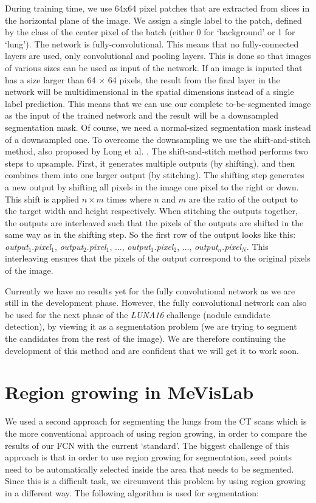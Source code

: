 \documentclass[a4paper,10pt]{article}
\numberwithin{equation}{section} %
\numberwithin{figure}{section} %
\numberwithin{table}{section} %
\begin{document}
During training time, we use 64x64 pixel patches that are extracted from slices in the horizontal plane of the image.
We assign a single label to the patch, defined by the class of the center pixel of the batch (either 0 for `background' or 1 for `lung').
The network is fully-convolutional. This means that no fully-connected layers are used, only convolutional and pooling layers.
This is done so that images of various sizes can be used as input of the network.
If an image is inputed that has a size larger than 64 $\times$ 64 pixels, the result from the final layer in the network will be multidimensional in the spatial dimensions instead of a single label prediction.
This means that we can use our complete to-be-segmented image as the input of the trained network and the result will be a downsampled segmentation mask.
Of course, we need a normal-sized segmentation mask instead of a downsampled one.
To overcome the downsampling we use the shift-and-stitch method, also proposed by Long et al. \cite{long2015fully}. The shift-and-stitch method performs two steps to upsample. First, it generates multiple outputs (by shifting), and then combines them into one larger output (by stitching). The shifting step generates a new output by shifting all pixels in the image one pixel to the right or down. This shift is applied $n \times m$ times where $n$ and $m$ are the ratio of the output to the target width and height respectively.
When stitching the outputs together, the outputs are interleaved such that the pixels of the outputs are shifted in the same way as in the shifting step. So the first row of the output looks like this: \textit{output}$_1$.\textit{pixel}$_1$, \textit{output}$_2$.\textit{pixel}$_1$, $\hdots$, \textit{output}$_1$.\textit{pixel}$_2$, $\hdots$, \textit{output}$_n$.\textit{pixel}$_N$. This interleaving ensures that the pixels of the output correspond to the original pixels of the image.

Currently we have no results yet for the fully convolutional network as we are still in the development phase. However, the fully convolutional network can also be used for the next phase of the \textit{LUNA16} challenge (nodule candidate detection), by viewing it as a segmentation problem (we are trying to segment the candidates from the rest of the image). We are therefore continuing the development of this method and are confident that we will get it to work soon.

\section{Region growing in MeVisLab}
We used a second approach for segmenting the lungs from the CT scans which is the more conventional approach of using region growing, in order to compare the results of our FCN with the current `standard'. The biggest challenge of this approach is that in order to use region growing for segmentation, seed points need to be automatically selected inside the area that needs to be segmented. Since this is a difficult task, we circumvent this problem by using region growing in a different way. The following algorithm is used for segmentation:
\end{document}
